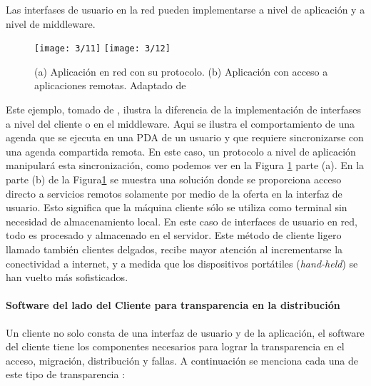      Las interfases de usuario en la red pueden implementarse a nivel de aplicación y a nivel de middleware.
	
	  \begin{figure}   
	  	 \begin{center} %
		\texttt{[image: 3/11]}
		\texttt{[image: 3/12]}
		\caption{(a) Aplicación en red con su protocolo. (b) Aplicación con acceso a  aplicaciones remotas. Adaptado de \cite{Steen2017}}
		\label{fig:Clientes-Hilos}
	 \end{center}
  \end{figure} 
	 
	Este ejemplo,  tomado de \cite{Steen2017}, ilustra la diferencia de la implementación de interfases a nivel del cliente o en el middleware. Aqui se ilustra el comportamiento de una agenda que se ejecuta en una PDA de un usuario  y que requiere sincronizarse con una agenda compartida remota. En este caso, un protocolo a nivel de aplicación manipulará esta sincronización, como podemos ver en la Figura \ref{fig:Clientes-Hilos} parte (a). En la parte (b) de la Figura\ref{fig:Clientes-Hilos}   se muestra una  solución donde se proporciona acceso directo a servicios remotos solamente por medio de la oferta en la interfaz de usuario. Esto significa que la máquina cliente sólo se utiliza como terminal sin necesidad de almacenamiento local. En este caso de interfaces de usuario en red, todo es procesado y almacenado en el servidor. Este método de \gls{cliente ligero} llamado también clientes delgados, recibe mayor atención al incrementarse la conectividad a internet, y a medida que los  dispositivos portátiles (\textit{hand-held}) se han vuelto más sofisticados. 
	
	
	\paragraph{Software del lado del Cliente para transparencia en la distribución}   
	  Un cliente no solo consta de una  interfaz de usuario y de la aplicación, el software   del cliente tiene los componentes necesarios para lograr la transparencia  en el acceso, migración, distribución y fallas. A continuación se menciona cada una de este tipo de transparencia \cite{Steen2017}:
	 
